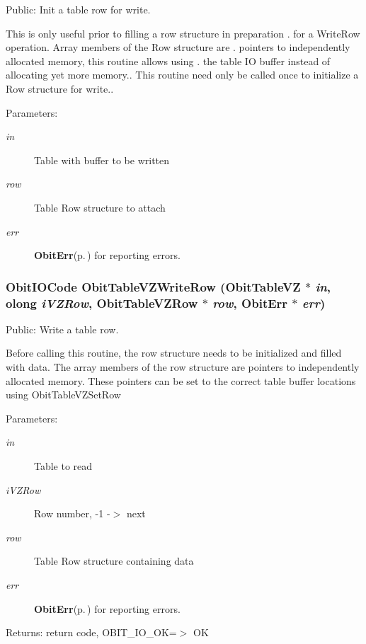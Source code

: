 Public: Init a table row for write. 

This is only useful prior to filling a row structure in preparation . for a Write\-Row operation. Array members of the Row structure are . pointers to independently allocated memory, this routine allows using . the table IO buffer instead of allocating yet more memory.. This routine need only be called once to initialize a Row structure for write.. \begin{Desc}
\item[Parameters:]
\begin{description}
\item[{\em in}]Table with buffer to be written \item[{\em row}]Table Row structure to attach \item[{\em err}]{\bf Obit\-Err}{\rm (p.\,\pageref{structObitErr})} for reporting errors. \end{description}
\end{Desc}
\subsubsection{\setlength{\rightskip}{0pt plus 5cm}Obit\-IOCode Obit\-Table\-VZWrite\-Row ({\bf Obit\-Table\-VZ} $\ast$ {\em in}, {\bf olong} {\em i\-VZRow}, {\bf Obit\-Table\-VZRow} $\ast$ {\em row}, {\bf Obit\-Err} $\ast$ {\em err})}\label{ObitTableVZ_8h_a20}


Public: Write a table row. 

Before calling this routine, the row structure needs to be initialized and filled with data. The array members of the row structure are pointers to independently allocated memory. These pointers can be set to the correct table buffer locations using Obit\-Table\-VZSet\-Row \begin{Desc}
\item[Parameters:]
\begin{description}
\item[{\em in}]Table to read \item[{\em i\-VZRow}]Row number, -1 -$>$ next \item[{\em row}]Table Row structure containing data \item[{\em err}]{\bf Obit\-Err}{\rm (p.\,\pageref{structObitErr})} for reporting errors. \end{description}
\end{Desc}
\begin{Desc}
\item[Returns:]return code, OBIT\_\-IO\_\-OK=$>$ OK \end{Desc}
